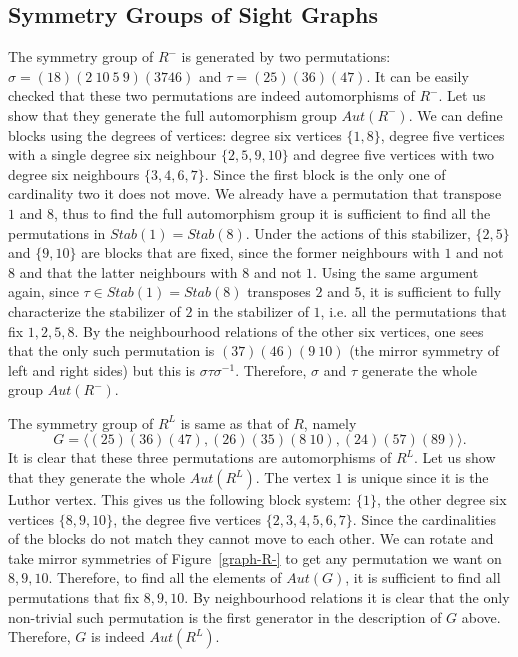 \documentclass[11pt, a4paper]{kybernetika}
\begin{document}
{		\subsection{Symmetry Groups of Sight Graphs}
		
		The symmetry group of $R^-$ is generated by two permutations: $\sigma=(18)(2\ 10\ 5\ 9)(3746)$ and $\tau=(25)(36)(47)$. It can be easily checked that these two permutations are indeed automorphisms of $R^-$. Let us show that they generate the full automorphism group $Aut(R^-)$. We can define blocks using the degrees of vertices: degree six vertices $\{1,8\}$, degree five vertices with a single degree six neighbour $\{2,5,9,10\}$ and degree five vertices with two degree six neighbours $\{3,4,6,7\}$. Since the first block is the only one of cardinality two it does not move. We already have a permutation that transpose $1$ and $8$, thus to find the full automorphism group it is sufficient to find all the permutations in $Stab(1)=Stab(8)$. Under the actions of this stabilizer, $\{2,5\}$ and $\{9,10\}$ are blocks that are fixed, since the former neighbours with $1$ and not $8$ and that the latter neighbours with $8$ and not $1$. Using the same argument again, since $\tau\in Stab(1)=Stab(8)$ transposes $2$ and $5$, it is sufficient to fully characterize the stabilizer of $2$ in the stabilizer of $1$, i.e. all the permutations that fix $1,2,5,8$. By the neighbourhood relations of the other six vertices, one sees that the only such permutation is $(37)(46)(9\ 10)$ (the mirror symmetry of left and right sides) but this is $\sigma\tau\sigma^{-1}$. Therefore, $\sigma$ and $\tau$ generate the whole group $Aut(R^-)$.
		
		
		The symmetry group of $R^L$ is same as that of $R$, namely $$G=\langle(25)(36)(47),(26)(35)(8\ 10),(24)(57)(89)\rangle.$$ It is clear that these three permutations are automorphisms of $R^L$. Let us show that they generate the whole $Aut(R^L)$. The vertex $1$ is unique since it is the Luthor vertex. This gives us the following block system: $\{1\}$, the other degree six vertices $\{8,9,10\}$, the degree five vertices $\{2,3,4,5,6,7\}$. Since the cardinalities of the blocks do not match they cannot move to each other. We can rotate and take mirror symmetries of Figure~\ref{graph-R-} to get any permutation we want on $8,9,10$. Therefore, to find all the elements of $Aut(G)$, it is sufficient to find all permutations that fix $8,9,10$. By neighbourhood relations it is clear that the only non-trivial such permutation is the first generator in the description of $G$ above. Therefore, $G$ is indeed $Aut(R^L)$.
	}
\end{document}

